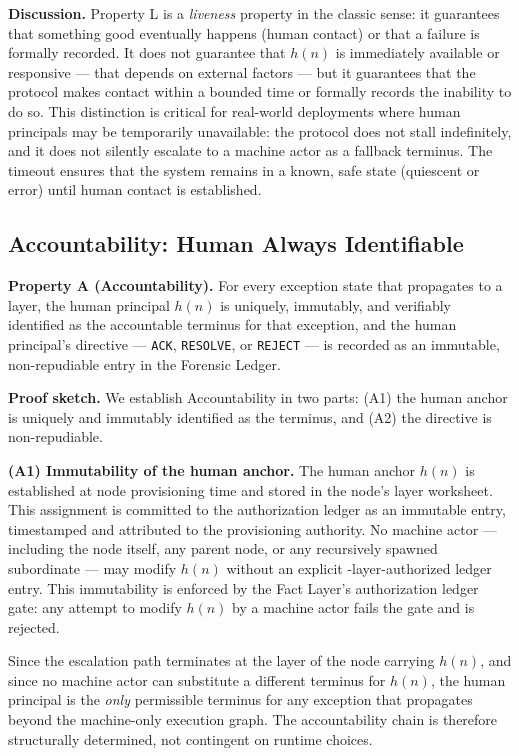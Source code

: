 \medskip
\noindent\textbf{Discussion.} Property L is a \emph{liveness} property in the classic sense: it guarantees that something good eventually happens (human contact) or that a failure is formally recorded. It does not guarantee that $h(n)$ is immediately available or responsive — that depends on external factors — but it guarantees that the protocol makes contact within a bounded time or formally records the inability to do so. This distinction is critical for real-world deployments where human principals may be temporarily unavailable: the protocol does not stall indefinitely, and it does not silently escalate to a machine actor as a fallback terminus. The timeout ensures that the system remains in a known, safe state (quiescent or error) until human contact is established.

\subsection{Accountability: Human Always Identifiable}

\textbf{Property A (Accountability).} For every exception state that propagates to a \purpose{} layer, the human principal $h(n)$ is uniquely, immutably, and verifiably identified as the accountable terminus for that exception, and the human principal's directive — \texttt{ACK}, \texttt{RESOLVE}, or \texttt{REJECT} — is recorded as an immutable, non-repudiable entry in the Forensic Ledger.

\medskip
\noindent\textbf{Proof sketch.} We establish Accountability in two parts: (A1) the human anchor is uniquely and immutably identified as the terminus, and (A2) the directive is non-repudiable.

\medskip
\noindent\textbf{(A1) Immutability of the human anchor.} The human anchor $h(n)$ is established at node provisioning time and stored in the node's \purpose{} layer worksheet. This assignment is committed to the authorization ledger as an immutable entry, timestamped and attributed to the provisioning authority. No machine actor — including the node itself, any parent node, or any recursively spawned subordinate — may modify $h(n)$ without an explicit \purpose-layer-authorized ledger entry. This immutability is enforced by the Fact Layer's authorization ledger gate: any attempt to modify $h(n)$ by a machine actor fails the gate and is rejected.

Since the escalation path terminates at the \purpose{} layer of the node carrying $h(n)$, and since no machine actor can substitute a different terminus for $h(n)$, the human principal is the \emph{only} permissible terminus for any exception that propagates beyond the machine-only execution graph. The accountability chain is therefore structurally determined, not contingent on runtime choices.

